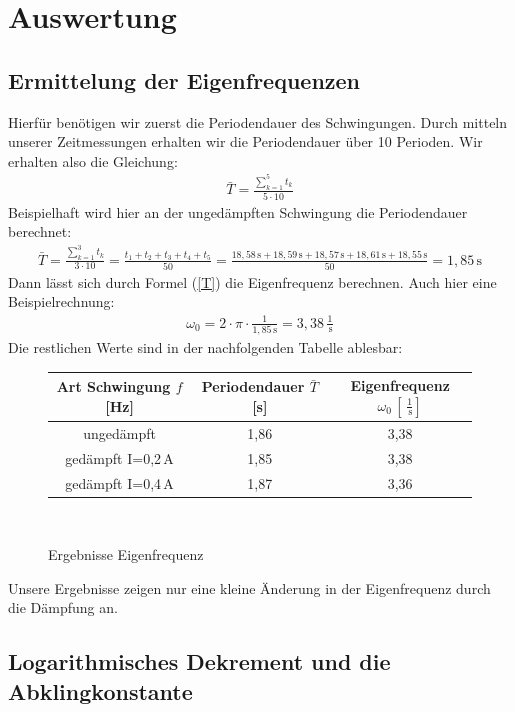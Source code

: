 \documentclass[fontsize=12pt]{scrartcl}
\begin{document}
\newpage

\section{ Auswertung}

\subsection{Ermittelung der Eigenfrequenzen}

Hierfür benötigen wir zuerst die Periodendauer des Schwingungen. Durch mitteln unserer Zeitmessungen erhalten wir die Periodendauer über 10 Perioden. Wir erhalten also die Gleichung:
\begin{align*}
\bar{T}= \frac{\sum\limits^5_{k=1} t_k}{5 \cdot 10}
\end{align*}
Beispielhaft wird hier an der ungedämpften Schwingung die Periodendauer berechnet:
\begin{align*}
\bar{T}= \frac{\sum\limits^3_{k=1} t_k}{3 \cdot 10} =\frac{ t_1+t_2+t_3+t_4+t_5}{50} =\frac{ 18,58\,\text{s}+18,59\,\text{s}+18,57\,\text{s}+18,61\,\text{s}+18,55\,\text{s}}{50}=1,85\,\text{s}
\end{align*}
Dann lässt sich durch Formel (\ref{T}) die Eigenfrequenz berechnen. Auch hier eine Beispielrechnung:
\begin{align*}
\omega_0=2\cdot \pi \cdot \frac{1}{1,85\,\text{s}} =3,38\,\frac{1}{\,\text{s}}
\end{align*}
Die restlichen Werte sind in der nachfolgenden Tabelle ablesbar:
\begin{figure}[H]
\caption{Ergebnisse Eigenfrequenz}
\centering
\begin{tabular}{c|c|c} \hline
Art Schwingung $f$ [Hz] & Periodendauer $\bar{T} $	[s] & Eigenfrequenz $\omega_0\,[\,\frac{1}{\,\text{s}}]$ \\ \hline
ungedämpft &1,86	&3,38 \\ \hline
gedämpft I=0,2\,A&1,85&	3,38 \\ \hline
gedämpft I=0,4\,A&1,87&	3,36 \\
\end{tabular} \\
\end{figure}
Unsere Ergebnisse zeigen nur eine kleine Änderung in der Eigenfrequenz durch die Dämpfung an.
\newpage
\subsection{Logarithmisches Dekrement und die Abklingkonstante}
\end{document}
